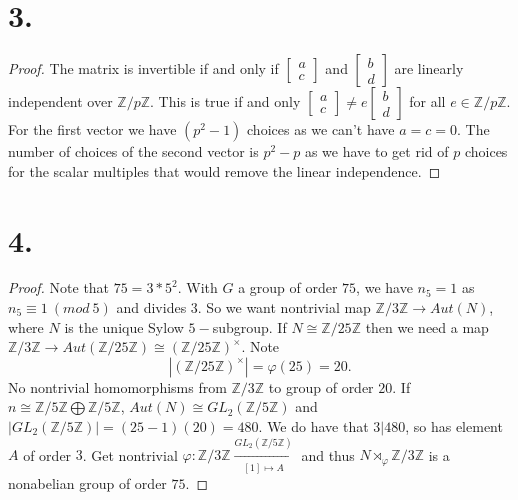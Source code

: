 \documentclass{article}
\begin{document}
\section*{3.}
\begin{proof}
    The matrix is invertible if and only if $\begin{bmatrix}
        a \\
        c
    \end{bmatrix}$ and $\begin{bmatrix}
        b \\
        d
    \end{bmatrix}$ are linearly independent over $\mathbb{Z}/p\mathbb{Z}$. This is true if and only $\begin{bmatrix}
        a \\
        c
    \end{bmatrix} \neq e\begin{bmatrix}
        b \\
        d
    \end{bmatrix}$ for all $e \in \mathbb{Z}/p\mathbb{Z}$. For the first vector we have $(p^2 - 1)$ choices as we can't have $a = c = 0$. The number of choices of the second vector is $p^2 - p$ as we have to get rid of $p$ choices for the scalar multiples that would remove the linear independence. 
\end{proof}

\section*{4.}
\begin{proof}
Note that $75 = 3*5^2$. With $G$ a group of order $75$, we have $n_5 = 1$ as $n_5 \equiv 1 \ (mod \ 5)$ and divides $3$. So we want nontrivial map $\mathbb{Z}/3\mathbb{Z} \to Aut(N)$, where $N$ is the unique Sylow $5-$subgroup. If $N \cong \mathbb{Z}/25\mathbb{Z}$ then we need a map $\mathbb{Z}/3 \mathbb{Z} \to Aut(\mathbb{Z}/25\mathbb{Z}) \cong (\mathbb{Z}/25\mathbb{Z})^{\times}$. Note
\[
 |(\mathbb{Z}/25\mathbb{Z})^{\times}| = \varphi(25) = 20 .
\] 
No nontrivial homomorphisms from $\mathbb{Z}/3\mathbb{Z}$ to group of order $20$. If $n \cong \mathbb{Z}/5 \mathbb{Z} \bigoplus \mathbb{Z}/5\mathbb{Z}$, $Aut(N) \cong GL_2(\mathbb{Z}/5\mathbb{Z})$ and $|GL_2(\mathbb{Z}/5\mathbb{Z})| = (25 - 1)(20) = 480.$
We do have that $3|480$, so has element $A$ of order $3$. Get nontrivial $\varphi: \mathbb{Z}/3\mathbb{Z} \xrightarrow[[1]\mapsto A]{GL_2(\mathbb{Z}/5\mathbb{Z})}$ and thus $N \rtimes_{\varphi}\mathbb{Z}/3\mathbb{Z}$ is a nonabelian group of order $75$. 
\end{proof}
\end{document}
